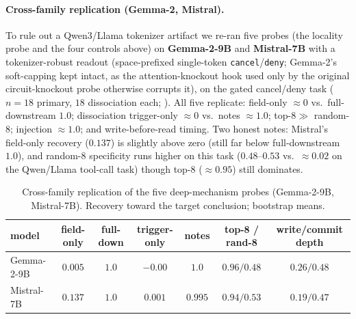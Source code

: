 \paragraph{Cross-family replication (Gemma-2, Mistral).} To rule out a Qwen3/Llama tokenizer artifact
we re-ran five probes (the locality probe and the four controls above) on \textbf{Gemma-2-9B} and
\textbf{Mistral-7B} with a tokenizer-robust readout
(space-prefixed single-token \texttt{cancel}/\texttt{deny}; Gemma-2's soft-capping kept intact, as the
attention-knockout hook used only by the original circuit-knockout probe otherwise corrupts it), on the
gated cancel/deny task ($n{=}18$ primary, $18$ dissociation each; ). All five replicate:
field-only $\approx0$ vs.\ full-downstream $1.0$; dissociation trigger-only $\approx0$ vs.\ notes
$\approx1.0$; top-$8 \gg$ random-$8$; injection $\approx1.0$; and write-before-read timing. Two honest
notes: Mistral's field-only recovery ($0.137$) is slightly above zero (still far below full-downstream
$1.0$), and random-$8$ specificity runs higher on this task ($0.48$--$0.53$ vs.\ ${\approx}0.02$ on the
Qwen/Llama tool-call task) though top-$8$ ($\approx0.95$) still dominates.

\begin{table}[h]
\centering\small
\caption{Cross-family replication of the five deep-mechanism probes (Gemma-2-9B, Mistral-7B).
Recovery toward the target conclusion; bootstrap means.}
\label{tab:xfamily}
\begin{tabular}{@{}lcccccc@{}}
\toprule
model & field-only & full-down & trigger-only & notes & top-8 / rand-8 & write/commit depth \\
\midrule
Gemma-2-9B  & $0.005$ & $1.0$ & $-0.00$ & $1.0$   & $0.96 / 0.48$ & $0.26 / 0.48$ \\
Mistral-7B  & $0.137$ & $1.0$ & $0.001$ & $0.995$ & $0.94 / 0.53$ & $0.19 / 0.47$ \\
\bottomrule
\end{tabular}
\end{table}

